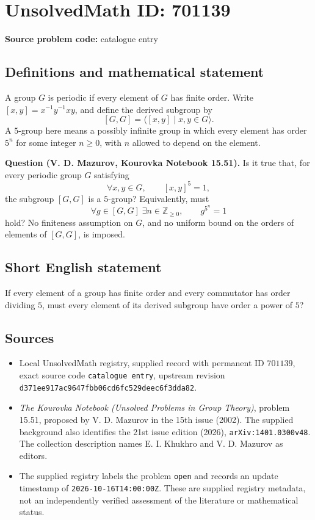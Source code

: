 \documentclass[11pt]{article}
\begin{document}
\section*{UnsolvedMath ID: 701139}
\textbf{Source problem code:} catalogue entry
\subsection{Definitions and mathematical statement}
A group \(G\) is periodic if every element of \(G\) has finite order. Write \([x,y]=x^{-1}y^{-1}xy\), and define the derived subgroup by
\[
[G,G]=\langle [x,y]\mid x,y\in G\rangle.
\]
A \(5\)-group here means a possibly infinite group in which every element has order \(5^n\) for some integer \(n\geq 0\), with \(n\) allowed to depend on the element.

\textbf{Question (V. D. Mazurov, Kourovka Notebook 15.51).} Is it true that, for every periodic group \(G\) satisfying
\[
\forall x,y\in G,\qquad [x,y]^5=1,
\]
the subgroup \([G,G]\) is a \(5\)-group? Equivalently, must
\[
\forall g\in [G,G]\;\exists n\in\mathbb Z_{\geq 0},\qquad g^{5^n}=1
\]
hold? No finiteness assumption on \(G\), and no uniform bound on the orders of elements of \([G,G]\), is imposed.
\subsection{Short English statement}
If every element of a group has finite order and every commutator has order dividing \(5\), must every element of its derived subgroup have order a power of \(5\)?
\subsection{Sources}
\begin{itemize}
\item Local UnsolvedMath registry, supplied record with permanent ID \(701139\), exact source code \texttt{catalogue entry}, upstream revision \texttt{d371ee917ac9647fbb06cd6fc529deec6f3dda82}.
\item \emph{The Kourovka Notebook (Unsolved Problems in Group Theory)}, problem 15.51, proposed by V. D. Mazurov in the 15th issue (2002). The supplied background also identifies the 21st issue edition (2026), \texttt{arXiv:1401.0300v48}. The collection description names E. I. Khukhro and V. D. Mazurov as editors.
\item The supplied registry labels the problem \texttt{open} and records an update timestamp of \texttt{2026-10-16T14:00:00Z}. These are supplied registry metadata, not an independently verified assessment of the literature or mathematical status.
\end{itemize}
\end{document}
